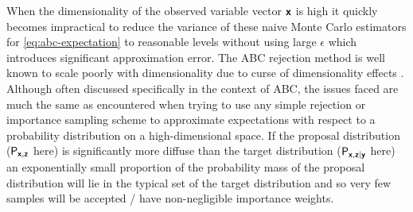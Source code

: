 When the dimensionality of the observed variable vector $\boldsymbol{\mathsf{x}}$ is high it quickly becomes impractical to reduce the variance of these naive Monte Carlo estimators for \eqref{eq:abc-expectation} to reasonable levels without using large $\epsilon$ which introduces significant approximation error. The \ac{ABC} rejection method is well known to scale poorly with dimensionality due to curse of dimensionality effects \citep{blum2010approximate,marin2012approximate,prangle2015summary}. Although often discussed specifically in the context of \ac{ABC}, the issues faced are much the same as encountered when trying to use any simple rejection or importance sampling scheme to approximate expectations with respect to a probability distribution on a high-dimensional space. If the proposal distribution ($\mathsf{P}_{\boldsymbol{\mathsf{x}},\boldsymbol{\mathsf{z}}}$ here) is significantly more diffuse than the target distribution ($\mathsf{P}_{\boldsymbol{\mathsf{x}},\boldsymbol{\mathsf{z}}|\boldsymbol{\mathsf{y}}}$ here) an exponentially small proportion of the probability mass of the proposal distribution will lie in the typical set of the target distribution and so very few samples will be accepted / have non-negligible importance weights.

